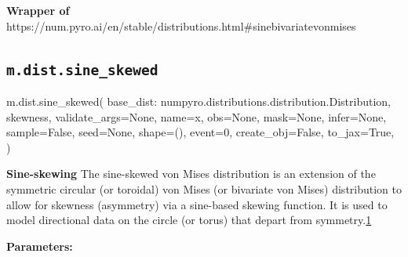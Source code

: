 \documentclass[
  letterpaper,
  DIV=11,
  numbers=noendperiod]{scrartcl}
\newenvironment{Shaded}{\begin{snugshade}}{\end{snugshade}}
\newcommand{\DecValTok}[1]{\textcolor[rgb]{0.68,0.00,0.00}{#1}}
\newcommand{\NormalTok}[1]{\textcolor[rgb]{0.00,0.23,0.31}{#1}}
\newcommand{\OperatorTok}[1]{\textcolor[rgb]{0.37,0.37,0.37}{#1}}
\newcommand{\StringTok}[1]{\textcolor[rgb]{0.13,0.47,0.30}{#1}}
\newcommand{\VariableTok}[1]{\textcolor[rgb]{0.07,0.07,0.07}{#1}}
\begin{document}
\textbf{Wrapper of}
https://num.pyro.ai/en/stable/distributions.html\#sinebivariatevonmises

\subsection{\texorpdfstring{\texttt{m.dist.sine\_skewed}}{m.dist.sine\_skewed}}\label{sine_skewed}

\begin{Shaded}
\begin{Highlighting}[]
\NormalTok{m.dist.sine\_skewed(}
\NormalTok{    base\_dist: numpyro.distributions.distribution.Distribution,}
\NormalTok{    skewness,}
\NormalTok{    validate\_args}\OperatorTok{=}\VariableTok{None}\NormalTok{,}
\NormalTok{    name}\OperatorTok{=}\StringTok{\textquotesingle{}x\textquotesingle{}}\NormalTok{,}
\NormalTok{    obs}\OperatorTok{=}\VariableTok{None}\NormalTok{,}
\NormalTok{    mask}\OperatorTok{=}\VariableTok{None}\NormalTok{,}
\NormalTok{    infer}\OperatorTok{=}\VariableTok{None}\NormalTok{,}
\NormalTok{    sample}\OperatorTok{=}\VariableTok{False}\NormalTok{,}
\NormalTok{    seed}\OperatorTok{=}\VariableTok{None}\NormalTok{,}
\NormalTok{    shape}\OperatorTok{=}\NormalTok{(),}
\NormalTok{    event}\OperatorTok{=}\DecValTok{0}\NormalTok{,}
\NormalTok{    create\_obj}\OperatorTok{=}\VariableTok{False}\NormalTok{,}
\NormalTok{    to\_jax}\OperatorTok{=}\VariableTok{True}\NormalTok{,}
\NormalTok{)}
\end{Highlighting}
\end{Shaded}

\textbf{Sine-skewing} The sine-skewed von Mises distribution is an
extension of the symmetric circular (or toroidal) von Mises (or
bivariate von Mises) distribution to allow for skewness (asymmetry) via
a sine-based skewing function. It is used to model directional data on
the circle (or torus) that depart from
symmetry.\href{https://arxiv.org/abs/1902.02579}{1}

\textbf{Parameters:}
\end{document}
